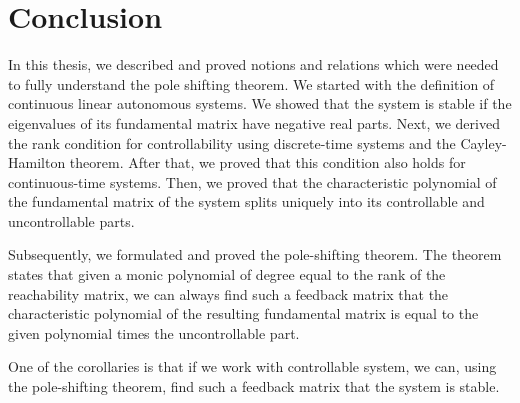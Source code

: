 \chapter*{Conclusion}

In this thesis, we described and proved notions and relations which were needed to fully understand the pole shifting theorem. We started with the definition of continuous linear autonomous systems. We showed that the system is stable if the eigenvalues of its fundamental matrix have negative real parts.
Next, we derived the rank condition for controllability using discrete-time systems and the Cayley-Hamilton theorem. After that, we proved that this condition also holds for continuous-time systems. Then, we proved that the characteristic polynomial of the fundamental matrix of the system splits uniquely into its controllable and uncontrollable parts. 

Subsequently, we formulated and proved the pole-shifting theorem. The theorem states that given a monic polynomial of degree equal to the rank of the reachability matrix, we can always find such a feedback matrix that the characteristic polynomial of the resulting fundamental matrix is equal to the given polynomial times the uncontrollable part.

One of the corollaries is that if we work with controllable system, we can, using the pole-shifting theorem, find such a feedback matrix that the system is stable. 
